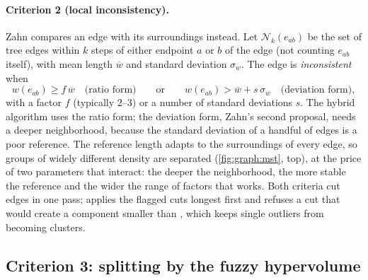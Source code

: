 \paragraph{Criterion 2 (local inconsistency).} Zahn \cite{zahn:1971} compares an edge with its surroundings instead. Let $\mathcal{N}_k(e_{ab})$ be the set of tree edges within $k$ steps of either endpoint $a$ or $b$ of the edge (not counting $e_{ab}$ itself), with mean length $\overline{w}$ and standard deviation $\sigma_w$. The edge is \emph{inconsistent} when
\begin{equation}
  w(e_{ab})\ge f\,\overline{w}\quad\text{(ratio form)}\qquad\text{or}\qquad
  w(e_{ab})>\overline{w}+s\,\sigma_w\quad\text{(deviation form)},
  \label{eq:graph:crit2}
\end{equation}
with a factor $f$ (typically $2$--$3$) or a number of standard deviations $s$. The hybrid algorithm uses the ratio form; the deviation form, Zahn's second proposal, needs a deeper neighborhood, because the standard deviation of a handful of edges is a poor reference. The reference length adapts to the surroundings of every edge, so groups of widely different density are separated (\cref{fig:graph:mst}, top), at the price of two parameters that interact: the deeper the neighborhood, the more stable the reference and the wider the range of factors that works. Both criteria cut edges in one pass;  applies the flagged cuts longest first and refuses a cut that would create a component smaller than , which keeps single outliers from becoming clusters.

\subsection{Criterion 3: splitting by the fuzzy hypervolume}\label{sec:graph:volume}

